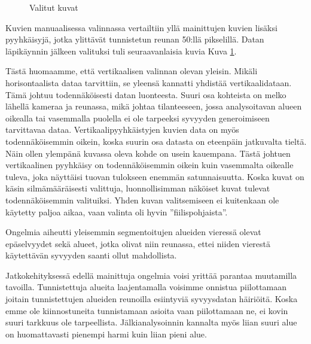 \begin{figure}[h]
    \centering
    \caption{Valitut kuvat}
    \label{fig:selected}
\end{figure}


Kuvien manuaalisessa valinnassa vertailtiin yllä mainittujen kuvien lisäksi pyyhkäisyjä,
jotka ylittävät tunnistetun reunan 50:llä pikselillä.
Datan läpikäynnin jälkeen valituksi tuli seuraavanlaisia kuvia Kuva \ref{fig:selected}.


Tästä huomaamme, että vertikaalisen valinnan olevan yleisin.
Mikäli horisontaalista dataa tarvittiin, se yleensä kannatti yhdistää vertikaalidataan.
Tämä johtuu todennäköisesti datan luonteesta. Suuri osa kohteista on melko lähellä kameraa ja reunassa, 
mikä johtaa tilanteeseen, jossa analysoitavan alueen oikealla tai vasemmalla puolella ei ole tarpeeksi syvyyden generoimiseen tarvittavaa dataa.
Vertikaalipyyhkäistyjen kuvien data on myös todennäköisemmin oikein, koska suurin osa datasta on eteenpäin jatkuvalta tieltä.
Näin ollen ylempänä kuvassa oleva kohde on usein kauempana.
Tästä johtuen vertikaalinen pyyhkäisy on todennäköisemmin oikein kuin vasemmalta oikealle tuleva, joka näyttäisi tuovan tulokseen enemmän satunnaisuutta.
Koska kuvat on käsin silmämääräisesti valittuja, luonnollisimman näköiset kuvat tulevat todennäköisemmin valituiksi.
Yhden kuvan valitsemiseen ei kuitenkaan ole käytetty paljoa aikaa, vaan valinta oli hyvin ”fiilispohjaista”.

Ongelmia aiheutti yleisemmin segmentoitujen alueiden vieressä olevat epäselvyydet sekä alueet, jotka olivat niin reunassa, ettei niiden vierestä käytettävän syvyyden saanti ollut mahdollista.

Jatkokehityksessä edellä mainittuja ongelmia voisi yrittää parantaa muutamilla tavoilla. 
Tunnistettuja alueita laajentamalla voisimme onnistua piilottamaan joitain tunnistettujen alueiden reunoilla esiintyviä syvyysdatan häiriöitä.
Koska emme ole kiinnostuneita tunnistamaan asioita vaan piilottamaan ne, ei kovin suuri tarkkuus ole tarpeellista.
Jälkianalysoinnin kannalta myös liian suuri alue on huomattavasti pienempi harmi kuin liian pieni alue.

